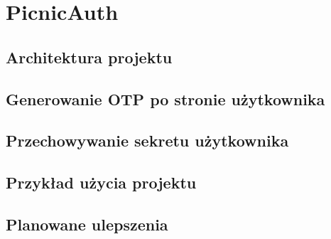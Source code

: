 \chapter{PicnicAuth}

\section{Architektura projektu}
\section{Generowanie OTP po stronie użytkownika}
\section{Przechowywanie sekretu użytkownika}
\section{Przykład użycia projektu}
\section{Planowane ulepszenia}


